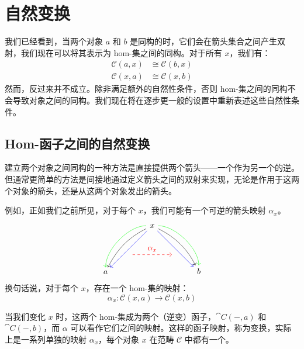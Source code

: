 \documentclass[DaoFP]{subfiles}
\begin{document}
\setcounter{chapter}{8}

\chapter{自然变换}

我们已经看到，当两个对象 $a$ 和 $b$ 是同构的时，它们会在箭头集合之间产生双射，我们现在可以将其表示为 hom-集之间的同构。对于所有 $x$，我们有：
\begin{align*}
\mathcal{C}(a, x) &\cong \mathcal{C}(b, x) \\
\mathcal{C}(x, a) &\cong \mathcal{C}(x, b)
\end{align*}
然而，反过来并不成立。除非满足额外的自然性条件，否则 hom-集之间的同构不会导致对象之间的同构。我们现在将在逐步更一般的设置中重新表述这些自然性条件。

\section{Hom-函子之间的自然变换}

建立两个对象之间同构的一种方法是直接提供两个箭头——一个作为另一个的逆。但通常更简单的方法是间接地通过定义箭头之间的双射来实现，无论是作用于这两个对象的箭头，还是从这两个对象发出的箭头。

例如，正如我们之前所见，对于每个 $x$，我们可能有一个可逆的箭头映射 $\alpha_x$。
\[
 \begin{tikzcd}
 \node(x) at (0, 2) {x};
 \node(a) at (-2, 0) {a};
 \node(b) at (2, 0) {b};
 \node(c1) at (-1, 1.5) {};
 \node(c2) at (-1.5, 1) {};
 \node(c3) at (-1, 2) {};
 \node(c4) at (-2, 1) {};
 \node(d1) at (1, 1.5) {};
 \node(d2) at (1.5, 1) {};
 \node(d3) at (1, 2) {};
 \node(d4) at (2, 1) {};
\node (aa) at (-1, 0.75) {};
 \node (bb) at (1, 0.75) {};
 \draw[->] (x) .. controls (c1)  and (c2) .. (a); %
 \draw[->, green] (x) .. controls (c3)  and (c4) .. (a); %
 \draw[->, blue] (x) -- (a); 
  \draw[->] (x) .. controls (d1)  and (d2) .. (b); %
 \draw[->, green] (x) .. controls (d3)  and (d4) .. (b); %
 \draw[->, blue] (x) -- (b); 
 \draw[->, red, dashed] (aa) -- node[above]{\alpha_x} (bb);
 \end{tikzcd}
\]
换句话说，对于每个 $x$，存在一个 hom-集的映射：
\[ \alpha_x \colon \mathcal{C}(x, a) \to \mathcal{C}(x, b) \]

当我们变化 $x$ 时，这两个 hom-集成为两个（逆变）函子，$\cat C(-, a)$ 和 $\cat C(-, b)$，而 $\alpha$ 可以看作它们之间的映射。这样的函子映射，称为变换，实际上是一系列单独的映射 $\alpha_x$，每个对象 $x$ 在范畴 $\mathcal{C}$ 中都有一个。
\end{document}
